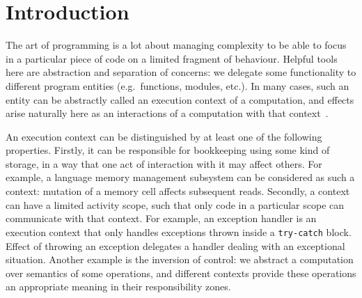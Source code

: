 \documentclass[acmsmall]{acmart}
\begin{document}



\maketitle


\section{Introduction} \label{sec:intro}


The art of programming is a lot about managing complexity to be able to focus in a particular piece of code on a limited fragment of behaviour.
Helpful tools here are abstraction and separation of concerns: we delegate some functionality to different program entities (e.g.\ functions, modules, etc.).
In many cases, such an entity can be abstractly called an execution context of a computation, and effects arise naturally here as an interactions of a computation with that context~\cite{kiselyov2013extensible}.

An execution context can be distinguished by at least one of the following properties.
Firstly, it can be responsible for bookkeeping using some kind of storage, in a way that one act of interaction with it may affect others.
For example, a language memory management subsystem can be considered as such a context: mutation of a memory cell affects subsequent reads.
Secondly, a context can have a limited activity scope, such that only code in a particular scope can communicate with that context.
For example, an exception handler is an execution context that only handles exceptions thrown inside a \texttt{try-catch} block.
Effect of throwing an exception delegates a handler dealing with an exceptional situation.
Another example is the inversion of control: we abstract a computation over semantics of some operations, and different contexts provide these operations an appropriate meaning in their responsibility zones.
\end{document}
